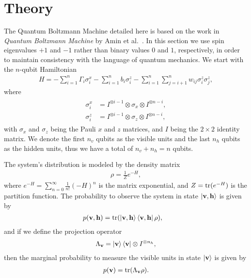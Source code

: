 \section{Theory}
The Quantum Boltzmann Machine detailed here is based on the work in \textit{Quantum Boltzmann Machine} by Amin et al.~\cite{amin_2018}.
In this section we use spin eigenvalues \( +1 \) and \( -1 \) rather than binary values \( 0 \) and \( 1 \), respectively, in order to maintain consistency with the language of quantum mechanics.
We start with the \( n \)-qubit Hamiltonian
\begin{align}
    H = -\sum_{i=1}^{n} \Gamma_i \sigma_i^x -\sum_{i=1}^{n} b_i \sigma_i^z - \sum_{i=1}^{n}\sum_{j=i+1}^{n} w_{ij} \sigma_i^z \sigma_j^z,
\end{align}
where
\begin{align}
\begin{split}
    \sigma_i^x
        &= I^{\otimes i-1} \otimes \sigma_x \otimes I^{\otimes n-i}, \\
    \sigma_i^z
        &= I^{\otimes i-1} \otimes \sigma_z \otimes I^{\otimes n-i},
\end{split}
\end{align}
with \( \sigma_x \) and \( \sigma_z \) being the Pauli \( x \) and \( z \) matrices, and \( I \) being the \( 2 \times 2 \) identity matrix.
We denote the first \( n_v \) qubits as the visible units and the last \( n_h \) qubits as the hidden units, thus we have a total of \( n_v + n_h = n \) qubits.

The system's distribution is modeled by the density matrix
\begin{align}
    \rho = \frac{1}{Z} e^{-H},
\label{eq:density_operator}
\end{align}
where \( e^{-H} = \sum_{n=0}^{\infty} \frac{1}{n!} (-H)^n \) is the matrix exponential, and \( Z = \text{tr}(e^{-H}) \) is the partition function.
The probability to observe the system in state \( \ket{\mathbf{v},\mathbf{h}} \) is given by
\begin{align}
    p(\mathbf{v},\mathbf{h})
        &= \text{tr}(\ket{\mathbf{v},\mathbf{h}}\bra{\mathbf{v},\mathbf{h}} \rho),
\end{align}
and if we define the projection operator
\begin{align}
    \Lambda_{\mathbf{v}} = \ket{\mathbf{v}}\bra{\mathbf{v}} \otimes I^{\otimes n_h},
\end{align}
then the marginal probability to measure the visible units in state \( \ket{\mathbf{v}} \) is given by
\begin{align}
    p(\mathbf{v}) = \text{tr}(\Lambda_{\mathbf{v}}\rho).
\end{align}


